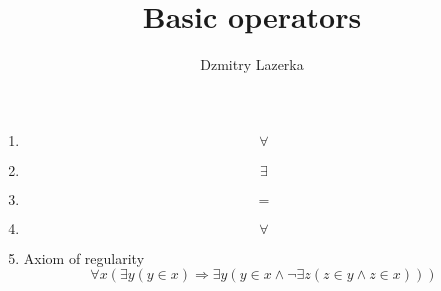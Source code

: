 \documentclass{article}
\title{Basic operators}
\author{Dzmitry Lazerka}
\begin{document}
\newenvironment{wikimathdb}[1]{$$}{$$}


\begin{enumerate}

\item
\begin{wikimathdb}{define}
\forall
\end{wikimathdb}

\item
\begin{wikimathdb}{define}
\exists
\end{wikimathdb}

\item
\begin{wikimathdb}{define}
=
\end{wikimathdb}

\item
\begin{wikimathdb}{define}
\forall
\end{wikimathdb}

\item
Axiom of regularity
$$
\forall x (\exists y (y \in x) \Rightarrow \exists y (y \in x \wedge
\neg \exists z (z \in y \wedge z \in x)))
$$

\end{enumerate}
\end{document}
